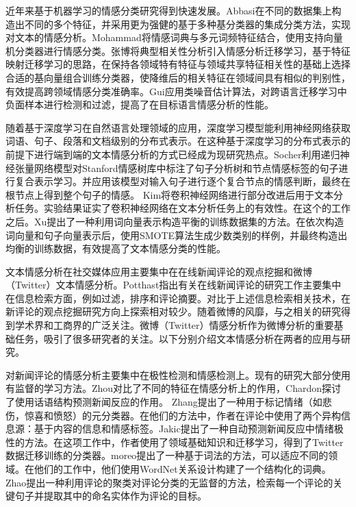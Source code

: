 近年来基于机器学习的情感分类研究得到快速发展。Abbasi在不同的数据集上构造出不同的多个特征，并采用更为强健的基于多种基分类器的集成分类方法，实现对文本的情感分析。Mohammad将情感词典与多元词频特征结合，使用支持向量机分类器进行情感分类。张博将典型相关性分析引入情感分析迁移学习，基于特征映射迁移学习的思路，在保持各领域特有特征与领域共享特征相关性的基础上选择合适的基向量组合训练分类器，使降维后的相关特征在领域间具有相似的判别性，有效提高跨领域情感分类准确率。Gui应用类噪音估计算法，对跨语言迁移学习中负面样本进行检测和过滤，提高了在目标语言情感分析的性能。

随着基于深度学习在自然语言处理领域的应用，深度学习模型能利用神经网络获取词语、句子、段落和文档级别的分布式表示。在这种基于深度学习的分布式表示的前提下进行端到端的文本情感分析的方式已经成为现研究热点。Socher利用递归神经张量网络模型对Stanford情感树库中标注了句子分析树和节点情感标签的句子进行复合表示学习。并应用该模型对输入句子进行逐个复合节点的情感判断，最终在根节点上得到整个句子的情感。 Kim将卷积神经网络进行部分改进后用于文本分析任务。实验结果证实了卷积神经网络在文本分析任务上的有效性。在这个的工作之后。Xu提出了一种利用词向量表示构造平衡的训练数据集的方法。在依次构造词向量和句子向量表示后，使用SMOTE算法生成少数类别的样例，并最终构造出均衡的训练数据，有效提高了文本情感分类的性能。


文本情感分析在社交媒体应用主要集中在在线新闻评论的观点挖掘和微博（Twitter）文本情感分析。Potthast指出有关在线新闻评论的研究工作主要集中在信息检索方面，例如过滤，排序和评论摘要。对比于上述信息检索相关技术，在新评论的观点挖掘研究方向上探索相对较少。随着微博的风靡，与之相关的研究得到学术界和工商界的广泛关注。微博（Twitter）情感分析作为微博分析的重要基础任务，吸引了很多研究者的关注。以下分别介绍文本情感分析在两者的应用与研究。

对新闻评论的情感分析主要集中在极性检测和情感检测上。现有的研究大部分使用有监督的学习方法。Zhou对比了不同的特征在情感分析上的作用，Chardon探讨了使用话语结构预测新闻反应的作用。 Zhang提出了一种用于标记情绪（如悲伤，惊喜和愤怒）的元分类器。在他们的方法中，作者在评论中使用了两个异构信息源：基于内容的信息和情感标签。Jakic提出了一种自动预测新闻反应中情绪极性的方法。在这项工作中，作者使用了领域基础知识和迁移学习，得到了Twitter数据迁移训练的分类器。moreo提出了一种基于词法的方法，可以适应不同的领域。在他们的工作中，他们使用WordNet关系设计构建了一个结构化的词典。 Zhao提出一种利用评论的聚类对评论分类的无监督的方法，检索每一个评论的关键句子并提取其中的命名实体作为评论的目标。


